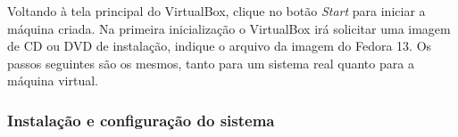 





Voltando à tela principal do VirtualBox, clique no botão \emph{Start}
para iniciar a máquina criada. Na primeira inicialização o VirtualBox
irá solicitar uma imagem de CD ou DVD de instalação, indique o arquivo
da imagem do Fedora 13. Os passos seguintes são os mesmos, tanto para um
sistema real quanto para a máquina virtual.

\subsubsection{Instalação e configuração do sistema}
\label{ssec:linux}



